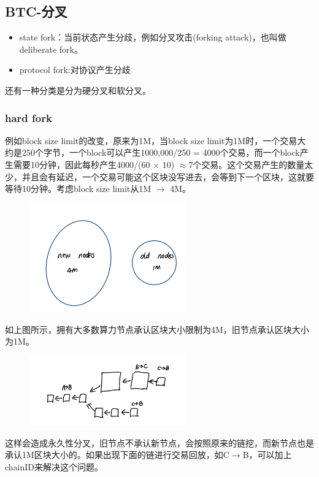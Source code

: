 \documentclass[10pt]{ctexart}
\begin{document}
\subsection{BTC-分叉}
\begin{itemize}
    \item state fork：当前状态产生分歧，例如分叉攻击(forking attack)，也叫做deliberate fork。
    \item protocol fork:对协议产生分歧
\end{itemize}
还有一种分类是分为硬分叉和软分叉。
\subsubsection{hard fork}
例如block size limit的改变，原来为1M，当block size limit为1M时，一个交易大约是250个字节，一个block可以产生1000,000/250 = 4000个交易，而一个block产生需要10分钟，因此每秒产生4000/(60 $\times$ 10) $\approx $7个交易。这个交易产生的数量太少，并且会有延迟，一个交易可能这个区块没写进去，会等到下一个区块，这就要等待10分钟。考虑block size limit从1M $\rightarrow$ 4M。
\begin{figure}[H]
    \centering
    \includegraphics[width=0.6\textwidth]{courses/区块链技术与应用/lecture10/img1.png} 
\end{figure}
如上图所示，拥有大多数算力节点承认区块大小限制为4M，旧节点承认区块大小为1M。
\begin{figure}[H]
    \centering
    \includegraphics[width=0.6\textwidth]{courses/区块链技术与应用/lecture10/img2.png} 
\end{figure}
这样会造成永久性分叉，旧节点不承认新节点，会按照原来的链挖，而新节点也是承认1M区块大小的。如果出现下面的链进行交易回放，如C$\rightarrow$B，可以加上chainID来解决这个问题。
\end{document}

